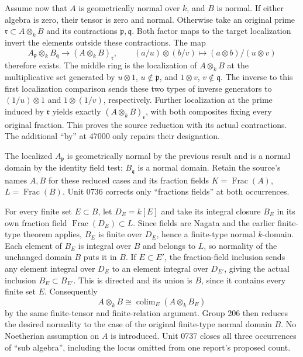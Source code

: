 Assume now that \(A\) is geometrically normal over \(k\), and \(B\) is normal. If either algebra is zero, their tensor is zero and normal. Otherwise take an original prime \(\mathfrak r\subset A\otimes_kB\) and its contractions \(\mathfrak p,\mathfrak q\). Both factor maps to the target localization invert the elements outside these contractions. The map \[
 A_{\mathfrak p}\otimes_kB_{\mathfrak q}
 \longrightarrow (A\otimes_kB)_{\mathfrak r},\qquad
 (a/u)\otimes(b/v)\longmapsto (a\otimes b)/(u\otimes v)
\] therefore exists. The middle ring is the localization of \(A\otimes_kB\) at the multiplicative set generated by \(u\otimes1\), \(u\notin\mathfrak p\), and \(1\otimes v\), \(v\notin\mathfrak q\). The inverse to this first localization comparison sends these two types of inverse generators to \((1/u)\otimes1\) and \(1\otimes(1/v)\), respectively. Further localization at the prime induced by \(\mathfrak r\) yields exactly \((A\otimes_kB)_{\mathfrak r}\), with both composites fixing every original fraction. This proves the source reduction with its actual contractions. The additional ``by'' at 47000 only repairs their designation.

The localized \(A_{\mathfrak p}\) is geometrically normal by the previous result and is a normal domain by the identity field test; \(B_{\mathfrak q}\) is a normal domain. Retain the source's names \(A,B\) for these reduced cases and its fraction fields \(K=\operatorname{Frac}(A)\), \(L=\operatorname{Frac}(B)\). Unit 0736 corrects only ``fractions fields'' at both occurrences.

For every finite set \(E\subset B\), let \(D_E=k[E]\) and take its integral closure \(B_E\) in its own fraction field \(\operatorname{Frac}(D_E)\subset L\). Since fields are Nagata and the earlier finite-type theorem applies, \(B_E\) is finite over \(D_E\), hence a finite-type normal \(k\)-domain. Each element of \(B_E\) is integral over \(B\) and belongs to \(L\), so normality of the unchanged domain \(B\) puts it in \(B\). If \(E\subset E'\), the fraction-field inclusion sends any element integral over \(D_E\) to an element integral over \(D_{E'}\), giving the actual inclusion \(B_E\subset B_{E'}\). This is directed and its union is \(B\), since it contains every finite set \(E\). Consequently \[
 A\otimes_kB\cong\operatorname{colim}_E(A\otimes_kB_E)
\] by the same finite-tensor and finite-relation argument. Group 206 then reduces the desired normality to the case of the original finite-type normal domain \(B\). No Noetherian assumption on \(A\) is introduced. Unit 0737 closes all three occurrences of ``sub algebra'', including the locus omitted from one report's proposed count.

